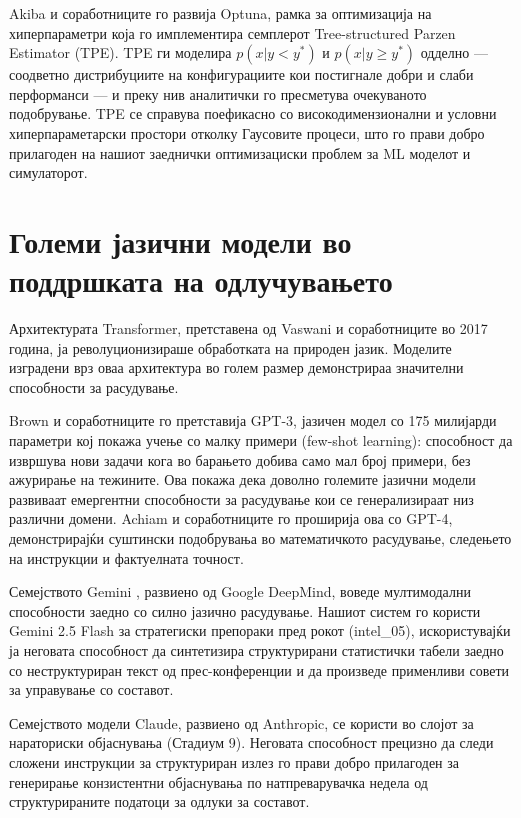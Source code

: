 Akiba и соработниците \cite{akiba2019optuna} го развија Optuna, рамка за оптимизација на хиперпараметри која го имплементира семплерот Tree-structured Parzen Estimator (TPE). TPE ги моделира $p(x|y < y^*)$ и $p(x|y \geq y^*)$ одделно — соодветно дистрибуциите на конфигурациите кои постигнале добри и слаби перформанси — и преку нив аналитички го пресметува очекуваното подобрување. TPE се справува поефикасно со високодимензионални и условни хиперпараметарски простори отколку Гаусовите процеси, што го прави добро прилагоден на нашиот заеднички оптимизациски проблем за ML моделот и симулаторот.

\section{Големи јазични модели во поддршката на одлучувањето}

Архитектурата Transformer, претставена од Vaswani и соработниците во 2017 година, ја револуционизираше обработката на природен јазик. Моделите изградени врз оваа архитектура во голем размер демонстрираа значителни способности за расудување.

Brown и соработниците \cite{brown2020gpt3} го претставија GPT-3, јазичен модел со 175 милијарди параметри кој покажа учење со малку примери (few-shot learning): способност да извршува нови задачи кога во барањето добива само мал број примери, без ажурирање на тежините. Ова покажа дека доволно големите јазични модели развиваат емергентни способности за расудување кои се генерализираат низ различни домени. Achiam и соработниците \cite{achiam2023gpt4} го проширија ова со GPT-4, демонстрирајќи суштински подобрувања во математичкото расудување, следењето на инструкции и фактуелната точност.

Семејството Gemini \cite{geminiteam2024gemini}, развиено од Google DeepMind, воведе мултимодални способности заедно со силно јазично расудување. Нашиот систем го користи Gemini 2.5 Flash за стратегиски препораки пред рокот (intel\_05), искористувајќи ја неговата способност да синтетизира структурирани статистички табели заедно со неструктуриран текст од прес-конференции и да произведе применливи совети за управување со составот.

Семејството модели Claude, развиено од Anthropic, се користи во слојот за нараториски објаснувања (Стадиум 9). Неговата способност прецизно да следи сложени инструкции за структуриран излез го прави добро прилагоден за генерирање конзистентни објаснувања по натпреварувачка недела од структурираните податоци за одлуки за составот.

